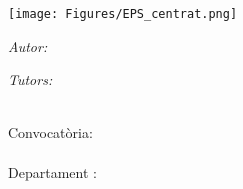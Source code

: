 

\begin{titlepage}

\setlength{\parskip}{0pt}

\begin{center}
\texttt{[image: Figures/EPS\_centrat.png]}

\vspace{2cm}

{\Large \studyprog\par}                      %
\vspace{0.2cm}
\vspace{3.5cm}                            
\textsc{\Large \ttype}                                 %
\vspace{0.2cm}

\HRule 
\vspace{0.4cm}
{\huge \bfseries \ttitle\par}                          %
\vspace{0.4cm}  
\HRule
\vspace{1cm}
 
\begin{minipage}[t]{0.4\textwidth}
\begin{flushleft} 
    \large
    \emph{Autor:}\\
    \authorname
\end{flushleft}
\end{minipage}
\begin{minipage}[t]{0.4\textwidth}
\begin{flushright} 
    \large
    \emph{Tutors:} \\
    \supnameA \\
    \supnameB
\end{flushright}
\end{minipage}

\vspace{2.5cm}
 \textsc{\Large \tdocument}                                 %
\vspace{0.2cm}

\vfill

{\large
Convocatòria:\\                                %
\tdate\\
\vspace{1.5cm}
Departament :\\
\deptname\\                                    %
}
\vfill
\end{center}
\end{titlepage}
\restoregeometry
